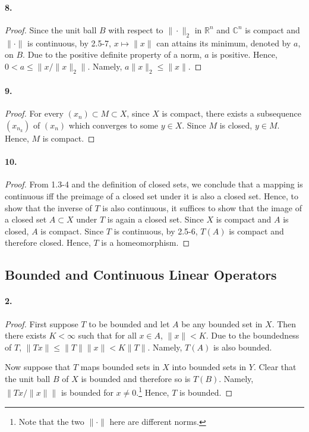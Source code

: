   \paragraph{8.}
  \begin{proof}
    Since the unit ball $B$ with respect to $\|\cdot\|_2$ in $\mathbb{R}^n$ and
    $\mathbb{C}^n$ is compact and $\|\cdot\|$ is continuous, by 2.5-7, $x\mapsto
    \|x\|$ can attains its minimum, denoted by $a$, on $B$. Due to the positive 
    definite property of a norm, $a$ is positive. Hence, $0<a\le \|x/\|x\|_2\|$.
    Namely, $a\|x\|_2\le\|x\|$.
  \end{proof}

  \paragraph{9.}
  \begin{proof}
    For every $(x_n)\subset M\subset X$, since $X$ is compact, there exists a 
    subsequence $(x_{n_k})$ of $(x_n)$ which converges to some $y\in X$. Since 
    $M$ is closed, $y\in M$. Hence, $M$ is compact.
  \end{proof}

  \paragraph{10.}
  \begin{proof}
    From 1.3-4 and the definition of closed sets, we conclude that a mapping is
    continuous iff the preimage of a closed set under it is also a closed set.
    Hence, to show that the inverse of $T$ is also continuous, it suffices to
    show that the image of a closed set $A\subset X$ under $T$ is again a closed
    set. Since $X$ is compact and $A$ is closed, $A$ is compact. Since $T$ is 
    continuous, by 2.5-6, $T(A)$ is compact and therefore closed. Hence, $T$ is
    a homeomorphism.
  \end{proof}

\subsection{Bounded and Continuous Linear Operators}
  \paragraph{2.}
  \begin{proof}
    First suppose $T$ to be bounded and let $A$ be any bounded set in $X$. Then
    there exists $K<\infty$ such that for all $x\in A$, $\|x\|<K$. Due to the
    boundedness of $T$, $\|Tx\|\le \|T\|\|x\|<K\|T\|$. Namely, $T(A)$ is also
    bounded.\par
    Now suppose that $T$ maps bounded sets in $X$ into bounded sets in $Y$. 
    Clear that the unit ball $B$ of $X$ is bounded and therefore so is $T(B)$.
    Namely, $\|Tx/\|x\|\|$ is bounded for $x\ne 0$.\footnote{Note that the two
    $\|\cdot\|$ here are different norms.} Hence, $T$ is bounded.
  \end{proof}

